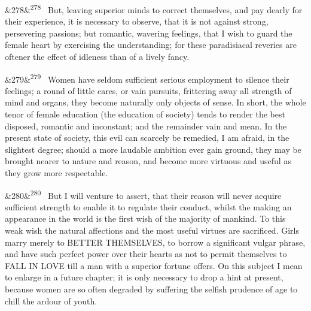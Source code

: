 \documentclass[12pt]{article}
\newcommand{\para}[1][]{\par\noindent\ifx&#1&\else\textsuperscript{\footnotesize #1}~\fi}
\begin{document}
\para[278] But, leaving superior minds to correct themselves, and pay dearly for their experience, it is necessary to observe, that it is not against strong, persevering passions; but romantic, wavering feelings, that I wish to guard the female heart by exercising the understanding; for these paradisiacal reveries are oftener the effect of idleness than of a lively fancy.

\para[279] Women have seldom sufficient serious employment to silence their feelings; a round of little cares, or vain pursuits, frittering away all strength of mind and organs, they become naturally only objects of sense. In short, the whole tenor of female education (the education of society) tends to render the best disposed, romantic and inconstant; and the remainder vain and mean. In the present state of society, this evil can scarcely be remedied, I am afraid, in the slightest degree; should a more laudable ambition ever gain ground, they may be brought nearer to nature and reason, and become more virtuous and useful as they grow more respectable.

\para[280] But I will venture to assert, that their reason will never acquire sufficient strength to enable it to regulate their conduct, whilst the making an appearance in the world is the first wish of the majority of mankind. To this weak wish the natural affections and the most useful virtues are sacrificed. Girls marry merely to BETTER THEMSELVES, to borrow a significant vulgar phrase, and have such perfect power over their hearts as not to permit themselves to FALL IN LOVE till a man with a superior fortune offers. On this subject I mean to enlarge in a future chapter; it is only necessary to drop a hint at present, because women are so often degraded by suffering the selfish prudence of age to chill the ardour of youth.
\end{document}
